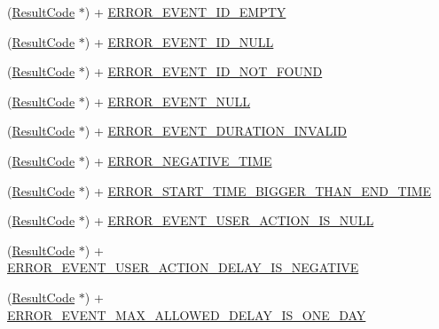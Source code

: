 \begin{DoxyCompactItemize}
\item 
(\hyperlink{interface_result_code}{Result\+Code} $\ast$) + \hyperlink{interface_result_code_a8ccbb6c68d999564ae1fc7e4677b9e26}{E\+R\+R\+O\+R\+\_\+\+E\+V\+E\+N\+T\+\_\+\+I\+D\+\_\+\+E\+M\+P\+T\+Y}
\item 
(\hyperlink{interface_result_code}{Result\+Code} $\ast$) + \hyperlink{interface_result_code_a6c9389354b81e95be855e1b700141462}{E\+R\+R\+O\+R\+\_\+\+E\+V\+E\+N\+T\+\_\+\+I\+D\+\_\+\+N\+U\+L\+L}
\item 
(\hyperlink{interface_result_code}{Result\+Code} $\ast$) + \hyperlink{interface_result_code_a5325e68c52620086e4125e13ee15015b}{E\+R\+R\+O\+R\+\_\+\+E\+V\+E\+N\+T\+\_\+\+I\+D\+\_\+\+N\+O\+T\+\_\+\+F\+O\+U\+N\+D}
\item 
(\hyperlink{interface_result_code}{Result\+Code} $\ast$) + \hyperlink{interface_result_code_aff3dcf58b24a3d692d5cdca3eb3196b1}{E\+R\+R\+O\+R\+\_\+\+E\+V\+E\+N\+T\+\_\+\+N\+U\+L\+L}
\item 
(\hyperlink{interface_result_code}{Result\+Code} $\ast$) + \hyperlink{interface_result_code_a3a333c0d489ba9a124edb1a0b98fae85}{E\+R\+R\+O\+R\+\_\+\+E\+V\+E\+N\+T\+\_\+\+D\+U\+R\+A\+T\+I\+O\+N\+\_\+\+I\+N\+V\+A\+L\+I\+D}
\item 
(\hyperlink{interface_result_code}{Result\+Code} $\ast$) + \hyperlink{interface_result_code_a3102a6ca20505fbbeac11cedc013e8cb}{E\+R\+R\+O\+R\+\_\+\+N\+E\+G\+A\+T\+I\+V\+E\+\_\+\+T\+I\+M\+E}
\item 
(\hyperlink{interface_result_code}{Result\+Code} $\ast$) + \hyperlink{interface_result_code_a05a70c8af1feb22cf05547cd3ab675dc}{E\+R\+R\+O\+R\+\_\+\+S\+T\+A\+R\+T\+\_\+\+T\+I\+M\+E\+\_\+\+B\+I\+G\+G\+E\+R\+\_\+\+T\+H\+A\+N\+\_\+\+E\+N\+D\+\_\+\+T\+I\+M\+E}
\item 
(\hyperlink{interface_result_code}{Result\+Code} $\ast$) + \hyperlink{interface_result_code_aa63e7fa786eff869fdc08b2333b6e733}{E\+R\+R\+O\+R\+\_\+\+E\+V\+E\+N\+T\+\_\+\+U\+S\+E\+R\+\_\+\+A\+C\+T\+I\+O\+N\+\_\+\+I\+S\+\_\+\+N\+U\+L\+L}
\item 
(\hyperlink{interface_result_code}{Result\+Code} $\ast$) + \hyperlink{interface_result_code_ab29e33aac09b6cfe0df0d86685881d2f}{E\+R\+R\+O\+R\+\_\+\+E\+V\+E\+N\+T\+\_\+\+U\+S\+E\+R\+\_\+\+A\+C\+T\+I\+O\+N\+\_\+\+D\+E\+L\+A\+Y\+\_\+\+I\+S\+\_\+\+N\+E\+G\+A\+T\+I\+V\+E}
\item 
(\hyperlink{interface_result_code}{Result\+Code} $\ast$) + \hyperlink{interface_result_code_ae40b07c22fe19a5d3b18b4669b4a99e7}{E\+R\+R\+O\+R\+\_\+\+E\+V\+E\+N\+T\+\_\+\+M\+A\+X\+\_\+\+A\+L\+L\+O\+W\+E\+D\+\_\+\+D\+E\+L\+A\+Y\+\_\+\+I\+S\+\_\+\+O\+N\+E\+\_\+\+D\+A\+Y}

\end{DoxyCompactItemize}
